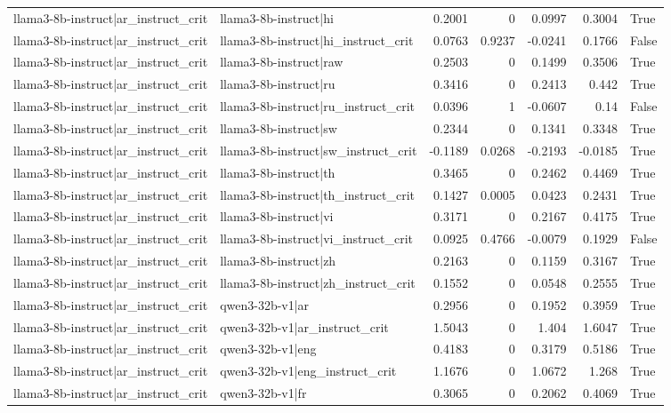 \begin{table}
\begin{tabular}{l l r r r r l}
llama3-8b-instruct|ar_instruct_crit & llama3-8b-instruct|hi & 0.2001 & 0 & 0.0997 & 0.3004 & True \\
llama3-8b-instruct|ar_instruct_crit & llama3-8b-instruct|hi_instruct_crit & 0.0763 & 0.9237 & -0.0241 & 0.1766 & False \\
llama3-8b-instruct|ar_instruct_crit & llama3-8b-instruct|raw & 0.2503 & 0 & 0.1499 & 0.3506 & True \\
llama3-8b-instruct|ar_instruct_crit & llama3-8b-instruct|ru & 0.3416 & 0 & 0.2413 & 0.442 & True \\
llama3-8b-instruct|ar_instruct_crit & llama3-8b-instruct|ru_instruct_crit & 0.0396 & 1 & -0.0607 & 0.14 & False \\
llama3-8b-instruct|ar_instruct_crit & llama3-8b-instruct|sw & 0.2344 & 0 & 0.1341 & 0.3348 & True \\
llama3-8b-instruct|ar_instruct_crit & llama3-8b-instruct|sw_instruct_crit & -0.1189 & 0.0268 & -0.2193 & -0.0185 & True \\
llama3-8b-instruct|ar_instruct_crit & llama3-8b-instruct|th & 0.3465 & 0 & 0.2462 & 0.4469 & True \\
llama3-8b-instruct|ar_instruct_crit & llama3-8b-instruct|th_instruct_crit & 0.1427 & 0.0005 & 0.0423 & 0.2431 & True \\
llama3-8b-instruct|ar_instruct_crit & llama3-8b-instruct|vi & 0.3171 & 0 & 0.2167 & 0.4175 & True \\
llama3-8b-instruct|ar_instruct_crit & llama3-8b-instruct|vi_instruct_crit & 0.0925 & 0.4766 & -0.0079 & 0.1929 & False \\
llama3-8b-instruct|ar_instruct_crit & llama3-8b-instruct|zh & 0.2163 & 0 & 0.1159 & 0.3167 & True \\
llama3-8b-instruct|ar_instruct_crit & llama3-8b-instruct|zh_instruct_crit & 0.1552 & 0 & 0.0548 & 0.2555 & True \\
llama3-8b-instruct|ar_instruct_crit & qwen3-32b-v1|ar & 0.2956 & 0 & 0.1952 & 0.3959 & True \\
llama3-8b-instruct|ar_instruct_crit & qwen3-32b-v1|ar_instruct_crit & 1.5043 & 0 & 1.404 & 1.6047 & True \\
llama3-8b-instruct|ar_instruct_crit & qwen3-32b-v1|eng & 0.4183 & 0 & 0.3179 & 0.5186 & True \\
llama3-8b-instruct|ar_instruct_crit & qwen3-32b-v1|eng_instruct_crit & 1.1676 & 0 & 1.0672 & 1.268 & True \\
llama3-8b-instruct|ar_instruct_crit & qwen3-32b-v1|fr & 0.3065 & 0 & 0.2062 & 0.4069 & True \\

\end{tabular}
\end{table}
